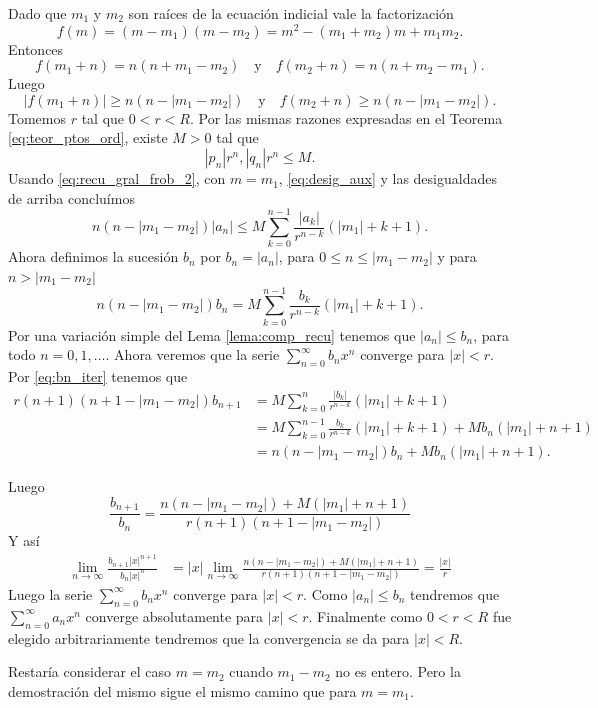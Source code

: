 \begin{demo} Dado que $m_1$ y $m_2$ son raíces de la ecuación indicial vale la factorización
\[f(m)=(m-m_1)(m-m_2)=m^2-(m_1+m_2)m+m_1m_2.\]
Entonces
\[f(m_1+n)=n(n+m_1-m_2)\quad\text{y}\quad f(m_2+n)=n(n+m_2-m_1).\]
Luego
\begin{equation}\label{eq:desig_aux}|f(m_1+n)|\geq n(n-|m_1-m_2|)\quad\text{y}\quad f(m_2+n)\geq n(n-|m_1-m_2|).
\end{equation}
Tomemos $r$ tal que $0<r<R$. Por las mismas razones expresadas  en el Teorema \eqref{eq:teor_ptos_ord},  existe $M>0$ tal que
\[ |p_n|r^n,|q_n|r^n\leq M.\]
Usando \eqref{eq:recu_gral_frob_2}, con $m=m_1$, \eqref{eq:desig_aux} y las desigualdades de arriba concluímos
\[n(n-|m_1-m_2|)|a_n|\leq M\sum_{k=0}^{n-1}\frac{|a_k|}{r^{n-k}}(|m_1|+k+1).\]
Ahora definimos la sucesión $b_n$ por $b_n=|a_n|$, para $0\leq n\leq|m_1-m_2|$ y para $ n>|m_1-m_2|$
\begin{equation}\label{eq:bn_iter}n(n-|m_1-m_2|)b_n= M\sum_{k=0}^{n-1}\frac{b_k}{r^{n-k}}(|m_1|+k+1).\end{equation}
Por una variación simple  del Lema \ref{lema:comp_recu} tenemos que $|a_n|\leq b_n$, para todo $n=0,1,\ldots$. Ahora veremos que la serie $\sum_{n=0}^{\infty}b_nx^n$ converge para  $|x|<r$. Por \eqref{eq:bn_iter} tenemos que
\[
   \begin{split}
     r(n+1)(n+1-|m_1-m_2|)b_{n+1}&=M\sum_{k=0}^{n}\frac{|b_k|}{r^{n-k}}(|m_1|+k+1)\\
&=M\sum_{k=0}^{n-1}\frac{b_k}{r^{n-k}}(|m_1|+k+1)+Mb_n(|m_1|+n+1)\\
&=n(n-|m_1-m_2|)b_n+Mb_n(|m_1|+n+1).
  \end{split}
\]

Luego
\[\frac{b_{n+1}}{b_n}=\frac{ n(n-|m_1-m_2|)+M(|m_1|+n+1) }{ r(n+1)(n+1-|m_1-m_2|)  }\]
Y así
\[ \begin{split}
\lim_{n\to\infty}\frac{b_{n+1}|x|^{n+1}}{b_n|x|^n}&=|x|\lim_{n\to\infty}\frac{ n(n-|m_1-m_2|)+M(|m_1|+n+1) }{ r(n+1)(n+1-|m_1-m_2|)  }=\frac{|x|}{r}
\end{split}
\]
Luego la serie  $\sum_{n=0}^{\infty}b_nx^n$   converge para $|x|<r$. Como $|a_n|\leq b_n$ tendremos que  $\sum_{n=0}^{\infty}a_nx^n$ converge absolutamente para $|x|<r$. Finalmente como $0<r<R$ fue elegido arbitrariamente tendremos que la convergencia se da para $|x|<R$.

Restaría considerar el caso $m=m_2$ cuando $m_1-m_2$ no es entero. Pero la demostración del mismo sigue el mismo camino que para $m=m_1$.

\end{demo}

